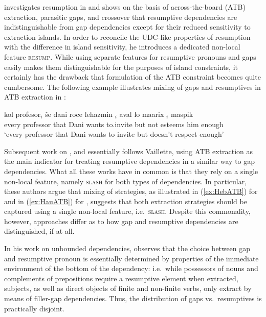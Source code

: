 \documentclass[output=paper
,notxmath 
 	        ,biblatex
                ,babelshorthands
                ,newtxmath
                ,draftmode
                ,colorlinks, citecolor=brown
]{langscibook}
\begin{document}
\citet{Vaillette:01} investigates resumption in  and shows on
the basis of across-the-board (ATB) extraction, parasitic gaps, and
crossover that resumptive dependencies are indistinguishable from gap
dependencies except for their reduced sensitivity to extraction
islands. In order to reconcile the UDC-like properties of resumption
with the difference in island sensitivity, he introduces a dedicated
non-local feature \textsc{resump}. While using separate features for
resumptive pronouns and gaps easily makes them distinguishable for the
purposes of island constraints, it certainly has the drawback that
formulation of the ATB constraint becomes quite cumbersome.
The following example illustrates mixing of gaps and resumptives in
ATB extraction in : 

\begin{exe}
  \ex \label{ex:HebATB}{
\gll kol profesor$_i$ še dani roce lehazmin \trace{}$_i$ aval lo maarix $_i$ maspik\footnotemark\\
     every professor that Dani wants to.invite {} but not esteems him enough\\
\glt `every professor that Dani wants to invite but doesn't respect enough'
}
\end{exe}

\noindent
Subsequent work on  \citep{taghvaipour:phd:05}, 
\citep{Borsley:13} and  \citep{Crysmann:12} essentially follows
Vaillette, using ATB extraction as the main indicator for treating
resumptive dependencies in a similar way to gap dependencies. What all these
works have in common is that they rely on a single non-local
feature, namely \textsc{slash} for both types of dependencies. In
particular, these authors argue that mixing of strategies, as
illustrated in (\ref{ex:HebATB}) for  and in (\ref{ex:HauATB})
for , suggests that both extraction
strategies should be captured using a single non-local feature,
i.e.\ \textsc{slash}. Despite this commonality, however, approaches
differ as to how gap and resumptive dependencies are distinguished, if
at all.

In his work on  unbounded dependencies,
\citet{Borsley.2010} observes that the choice between gap and
resumptive pronoun is essentially determined by properties of the
immediate environment of the bottom of the dependency: i.e.\ while
possessors of nouns and complements of prepositions require a
resumptive element when extracted, subjects, as well as direct objects
of finite and non-finite verbs, only extract by means of filler-gap
dependencies. Thus, the distribution of gaps vs.\ resumptives is
practically disjoint.
\end{document}
